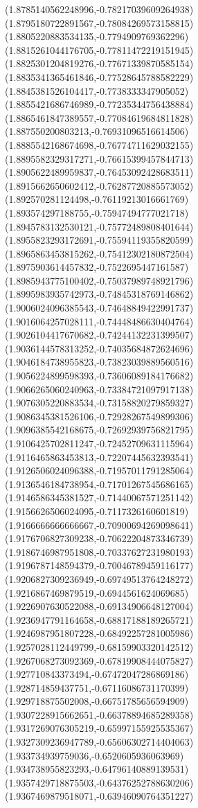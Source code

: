 \documentclass[12pt]{article}
\theoremstyle{plain}
\theoremstyle{definition}
\theoremstyle{remark}
\begin{document}
\begin{figure}
{  (1.8785140562248996,-0.78217039609264938)%
  (1.8795180722891567,-0.78084269573158815)%
  (1.8805220883534135,-0.7794909769362296)%
  (1.8815261044176705,-0.77811472219151945)%
  (1.8825301204819276,-0.77671339870585154)%
  (1.8835341365461846,-0.77528645788582229)%
  (1.8845381526104417,-0.7738333347905052)%
  (1.8855421686746989,-0.77235344756438884)%
  (1.8865461847389557,-0.77084619684811828)%
  (1.887550200803213,-0.76931096516614506)%
  (1.8885542168674698,-0.76774711629032155)%
  (1.8895582329317271,-0.76615399457844713)%
  (1.8905622489959837,-0.76453092428683511)%
  (1.8915662650602412,-0.76287720885573052)%
  (1.892570281124498,-0.76119213016661769)%
  (1.893574297188755,-0.75947494777021718)%
  (1.8945783132530121,-0.75772489808401644)%
  (1.8955823293172691,-0.75594119355820599)%
  (1.8965863453815262,-0.75412302180872504)%
  (1.8975903614457832,-0.7522695447161587)%
  (1.8985943775100402,-0.75037989748921796)%
  (1.8995983935742973,-0.74845318769146862)%
  (1.9006024096385543,-0.74648849422991737)%
  (1.9016064257028111,-0.74448486630404764)%
  (1.9026104417670682,-0.74244132231399507)%
  (1.9036144578313252,-0.74035684872624696)%
  (1.9046184738955823,-0.73823039889560516)%
  (1.9056224899598393,-0.73606089184176682)%
  (1.9066265060240963,-0.73384721097917138)%
  (1.9076305220883534,-0.73158820279859327)%
  (1.9086345381526106,-0.72928267549899306)%
  (1.9096385542168675,-0.72692939756821795)%
  (1.9106425702811247,-0.72452709631115964)%
  (1.9116465863453813,-0.72207445632393541)%
  (1.9126506024096388,-0.71957011791285064)%
  (1.9136546184738954,-0.71701267545686165)%
  (1.9146586345381527,-0.71440067571251142)%
  (1.9156626506024095,-0.7117326160601819)%
  (1.9166666666666667,-0.70900694269098641)%
  (1.9176706827309238,-0.70622204873346739)%
  (1.9186746987951808,-0.70337627231980193)%
  (1.9196787148594379,-0.70046789459116177)%
  (1.9206827309236949,-0.69749513764248272)%
  (1.9216867469879519,-0.6944561624069685)%
  (1.9226907630522088,-0.69134906648127004)%
  (1.9236947791164658,-0.68817188189265721)%
  (1.9246987951807228,-0.68492257281005986)%
  (1.9257028112449799,-0.68159903320142512)%
  (1.9267068273092369,-0.67819908444075827)%
  (1.927710843373494,-0.67472047286869186)%
  (1.928714859437751,-0.67116086731170399)%
  (1.929718875502008,-0.66751785656594909)%
  (1.9307228915662651,-0.66378894685289358)%
  (1.9317269076305219,-0.65997155925535367)%
  (1.9327309236947789,-0.65606302714404063)%
  (1.933734939759036,-0.6520605936063969)%
  (1.934738955823293,-0.64796140889139531)%
  (1.9357429718875503,-0.64376252788630206)%
  (1.9367469879518071,-0.63946090764351227)%
}
\end{figure}
\end{document}
